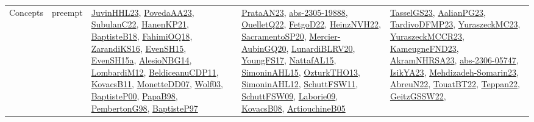 {\begin{longtable}{lp{3cm}>{\raggedright}p{6cm}>{\raggedright}p{6cm}p{8cm}}
Concepts & preempt & \href{papers/JuvinHHL23.pdf}{JuvinHHL23}\cite{JuvinHHL23}, \href{papers/PovedaAA23.pdf}{PovedaAA23}\cite{PovedaAA23}, \href{articles/SubulanC22.pdf}{SubulanC22}\cite{SubulanC22}, \href{papers/HanenKP21.pdf}{HanenKP21}\cite{HanenKP21}, \href{articles/BaptisteB18.pdf}{BaptisteB18}\cite{BaptisteB18}, \href{articles/FahimiOQ18.pdf}{FahimiOQ18}\cite{FahimiOQ18}, \href{articles/ZarandiKS16.pdf}{ZarandiKS16}\cite{ZarandiKS16}, \href{papers/EvenSH15.pdf}{EvenSH15}\cite{EvenSH15}, \href{articles/EvenSH15a.pdf}{EvenSH15a}\cite{EvenSH15a}, \href{papers/AlesioNBG14.pdf}{AlesioNBG14}\cite{AlesioNBG14}, \href{articles/LombardiM12.pdf}{LombardiM12}\cite{LombardiM12}, \href{articles/BeldiceanuCDP11.pdf}{BeldiceanuCDP11}\cite{BeldiceanuCDP11}, \href{articles/KovacsB11.pdf}{KovacsB11}\cite{KovacsB11}, \href{papers/MonetteDD07.pdf}{MonetteDD07}\cite{MonetteDD07}, \href{papers/Wolf03.pdf}{Wolf03}\cite{Wolf03}, \href{articles/BaptisteP00.pdf}{BaptisteP00}\cite{BaptisteP00}, \href{articles/PapaB98.pdf}{PapaB98}\cite{PapaB98}, \href{papers/PembertonG98.pdf}{PembertonG98}\cite{PembertonG98}, \href{papers/BaptisteP97.pdf}{BaptisteP97}\cite{BaptisteP97} & \href{articles/PrataAN23.pdf}{PrataAN23}\cite{PrataAN23}, \href{articles/abs-2305-19888.pdf}{abs-2305-19888}\cite{abs-2305-19888}, \href{papers/OuelletQ22.pdf}{OuelletQ22}\cite{OuelletQ22}, \href{articles/FetgoD22.pdf}{FetgoD22}\cite{FetgoD22}, \href{articles/HeinzNVH22.pdf}{HeinzNVH22}\cite{HeinzNVH22}, \href{articles/SacramentoSP20.pdf}{SacramentoSP20}\cite{SacramentoSP20}, \href{papers/Mercier-AubinGQ20.pdf}{Mercier-AubinGQ20}\cite{Mercier-AubinGQ20}, \href{articles/LunardiBLRV20.pdf}{LunardiBLRV20}\cite{LunardiBLRV20}, \href{papers/YoungFS17.pdf}{YoungFS17}\cite{YoungFS17}, \href{articles/NattafAL15.pdf}{NattafAL15}\cite{NattafAL15}, \href{articles/SimoninAHL15.pdf}{SimoninAHL15}\cite{SimoninAHL15}, \href{articles/OzturkTHO13.pdf}{OzturkTHO13}\cite{OzturkTHO13}, \href{papers/SimoninAHL12.pdf}{SimoninAHL12}\cite{SimoninAHL12}, \href{articles/SchuttFSW11.pdf}{SchuttFSW11}\cite{SchuttFSW11}, \href{papers/SchuttFSW09.pdf}{SchuttFSW09}\cite{SchuttFSW09}, \href{papers/Laborie09.pdf}{Laborie09}\cite{Laborie09}, \href{articles/KovacsB08.pdf}{KovacsB08}\cite{KovacsB08}, \href{papers/ArtiouchineB05.pdf}{ArtiouchineB05}\cite{ArtiouchineB05} & \href{papers/TasselGS23.pdf}{TasselGS23}\cite{TasselGS23}, \href{papers/AalianPG23.pdf}{AalianPG23}\cite{AalianPG23}, \href{papers/TardivoDFMP23.pdf}{TardivoDFMP23}\cite{TardivoDFMP23}, \href{papers/YuraszeckMC23.pdf}{YuraszeckMC23}\cite{YuraszeckMC23}, \href{articles/YuraszeckMCCR23.pdf}{YuraszeckMCCR23}\cite{YuraszeckMCCR23}, \href{papers/KameugneFND23.pdf}{KameugneFND23}\cite{KameugneFND23}, \href{articles/AkramNHRSA23.pdf}{AkramNHRSA23}\cite{AkramNHRSA23}, \href{articles/abs-2306-05747.pdf}{abs-2306-05747}\cite{abs-2306-05747}, \href{articles/IsikYA23.pdf}{IsikYA23}\cite{IsikYA23}, \href{papers/Mehdizadeh-Somarin23.pdf}{Mehdizadeh-Somarin23}\cite{Mehdizadeh-Somarin23}, \href{articles/AbreuN22.pdf}{AbreuN22}\cite{AbreuN22}, \href{papers/TouatBT22.pdf}{TouatBT22}\cite{TouatBT22}, \href{papers/Teppan22.pdf}{Teppan22}\cite{Teppan22}, \href{papers/GeitzGSSW22.pdf}{GeitzGSSW22}\cite{GeitzGSSW22}, 
\end{longtable}}
